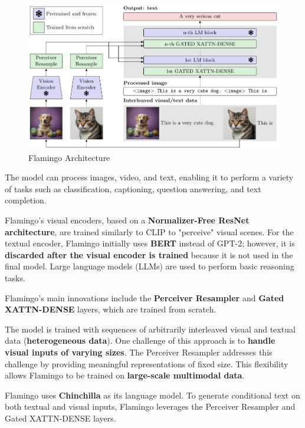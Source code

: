 \begin{figure}[!htbp]
    \centering
    \includegraphics[width=\linewidth]{tikz/chapter11 - Flamingo Architecture.pdf}
    \caption{Flamingo Architecture}
\end{figure}

The model can process images, video, and text, enabling it to perform a variety of tasks such as classification, captioning, question answering, and text completion.

Flamingo's visual encoders, based on a \textbf{Normalizer-Free ResNet architecture}, are trained similarly to CLIP to "perceive" visual scenes. For the textual encoder, Flamingo initially uses \textbf{BERT} instead of GPT-2; however, it is \textbf{discarded after the visual encoder is trained} because it is not used in the final model. Large language models (LLMs) are used to perform basic reasoning tasks.

Flamingo's main innovations include the \textbf{Perceiver Resampler} and \textbf{Gated XATTN-DENSE} layers, which are trained from scratch.

The model is trained with sequences of arbitrarily interleaved visual and textual data (\textbf{heterogeneous data}). One challenge of this approach is to \textbf{handle visual inputs of varying sizes}. The Perceiver Resampler addresses this challenge by providing meaningful representations of fixed size. This flexibility allows Flamingo to be trained on \textbf{large-scale multimodal data}.

Flamingo uses \textbf{Chinchilla} as its language model. To generate conditional text on both textual and visual inputs, Flamingo leverages the Perceiver Resampler and Gated XATTN-DENSE layers.





